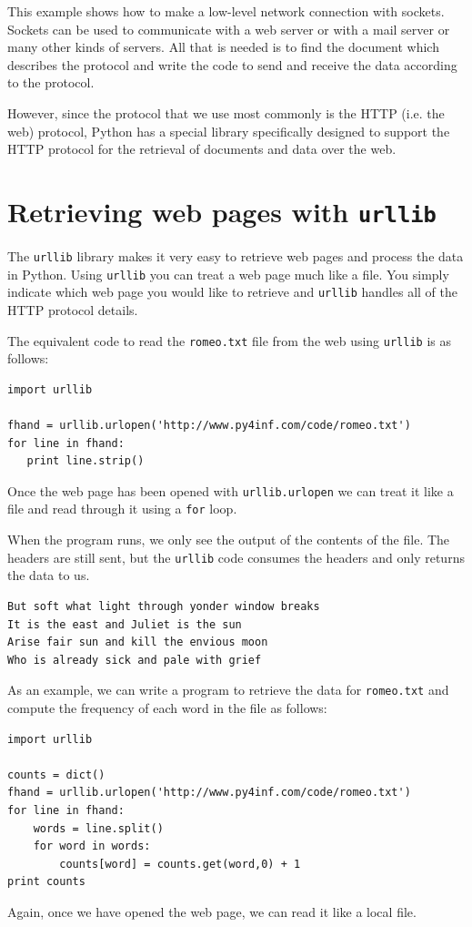 \documentclass[10pt]{book}
\begin{document}
This example shows how to make a low-level network connection
with sockets.   Sockets can be used to communicate with a web
server or with a mail server or many other kinds of servers.
All that is needed is to find the document which describes
the protocol and write the code to send and receive the data
according to the protocol.

However, since the protocol that we use most commonly is
the HTTP (i.e. the web) protocol, Python has a special 
library specifically designed to support the HTTP protocol 
for the retrieval of
documents and data over the web.

\section{Retrieving web pages with {\tt urllib}}

The {\tt urllib} library makes it very easy to retrieve
web pages and process the data in Python.   Using {\tt urllib}
you can treat a web page much like a file.   You simply
indicate which web page you would like to retrieve and
{\tt urllib} handles all of the HTTP protocol details.

The equivalent code to read the {\tt romeo.txt} file
from the web using {\tt urllib} is as follows:

\beforeverb
\begin{verbatim}
import urllib

fhand = urllib.urlopen('http://www.py4inf.com/code/romeo.txt')
for line in fhand:
   print line.strip()
\end{verbatim}
\afterverb
%
Once the web page has been opened with 
{\tt urllib.urlopen} we can treat it like 
a file and read through it using a 
{\tt for} loop.   

When the program runs, we only see the output
of the contents of the file.   The headers
are still sent, but the {\tt urllib} code
consumes the headers and only returns the 
data to us.

\beforeverb
\begin{verbatim}
But soft what light through yonder window breaks
It is the east and Juliet is the sun
Arise fair sun and kill the envious moon
Who is already sick and pale with grief
\end{verbatim}
\afterverb
%

As an example, we can write 
a program to retrieve the data for
{\tt romeo.txt} and compute the frequency
of each word in the file as follows:

\beforeverb
\begin{verbatim}
import urllib

counts = dict()
fhand = urllib.urlopen('http://www.py4inf.com/code/romeo.txt')
for line in fhand:
    words = line.split()
    for word in words:
        counts[word] = counts.get(word,0) + 1   
print counts
\end{verbatim}
\afterverb
%
Again, once we have opened the web page, 
we can read it like a local file.
\end{document}
